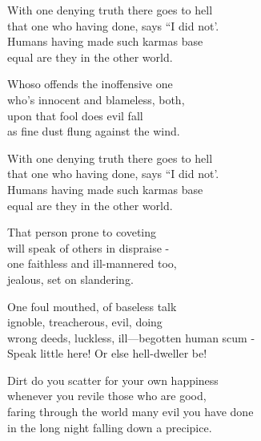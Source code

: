 \begin{MyDescription}{}
With one denying truth there goes to hell\\
that one who having done, says “I did not'.\\
Humans having made such karmas base\\
equal are they in the other world.
\end{MyDescription} 

\begin{MyDescription}{}
Whoso offends the inoffensive one\\
who's innocent and blameless, both,\\
upon that fool does evil fall\\
as fine dust flung against the wind.
\end{MyDescription} 

\begin{MyDescription}{}
With one denying truth there goes to hell\\
that one who having done, says “I did not'.\\
Humans having made such karmas base\\
equal are they in the other world.
\end{MyDescription} 

\begin{MyDescription}{}
That person prone to coveting\\
will speak of others in dispraise -\\
one faithless and ill-mannered too,\\
jealous, set on slandering.
\end{MyDescription} 

\begin{MyDescription}{}
One foul mouthed, of baseless talk\\
ignoble, treacherous, evil, doing\\
wrong deeds, luckless, ill—begotten human scum -\\
Speak little here! Or else hell-dweller be!
\end{MyDescription} 

\begin{MyDescription}{}
Dirt do you scatter for your own happiness\\
whenever you revile those who are good,\\
faring through the world many evil you have done\\
in the long night falling down a precipice.
\end{MyDescription} 

